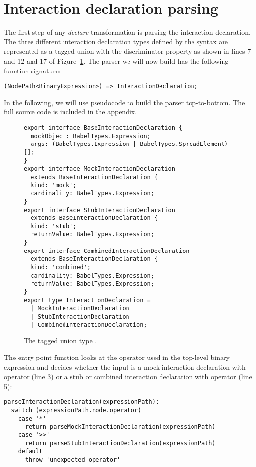 \section{Interaction declaration parsing}
The first step of any \textit{declare} transformation
is parsing the interaction declaration.
The three different interaction declaration types defined by the syntax
are represented as a tagged union 
with the discriminator property 
as shown in lines 7 and 12 and 17
of Figure~\ref{fig:InteractionDeclarationType}.
The parser we will now build has the following function signature:
\begin{verbatim}
(NodePath<BinaryExpression>) => InteractionDeclaration;
\end{verbatim}
In the following, we will use pseudocode to build the parser top-to-bottom.
The full source code is included in the appendix.

\begin{figure}
  \begin{verbatim}
export interface BaseInteractionDeclaration {
  mockObject: BabelTypes.Expression;
  args: (BabelTypes.Expression | BabelTypes.SpreadElement)[];
}
export interface MockInteractionDeclaration
  extends BaseInteractionDeclaration {
  kind: 'mock';
  cardinality: BabelTypes.Expression;
}
export interface StubInteractionDeclaration
  extends BaseInteractionDeclaration {
  kind: 'stub';
  returnValue: BabelTypes.Expression;
}
export interface CombinedInteractionDeclaration
  extends BaseInteractionDeclaration {
  kind: 'combined';
  cardinality: BabelTypes.Expression;
  returnValue: BabelTypes.Expression;
}
export type InteractionDeclaration =
  | MockInteractionDeclaration
  | StubInteractionDeclaration
  | CombinedInteractionDeclaration;
  \end{verbatim}
  \caption{
    The tagged union type .
  }\label{fig:InteractionDeclarationType}
\end{figure}

The entry point function 
looks at the operator used in the top-level binary expression
and decides whether the input is
a mock interaction declaration with operator  (line 3)
or a stub or combined interaction declaration with operator  (line 5):
\begin{verbatim}
parseInteractionDeclaration(expressionPath):
  switch (expressionPath.node.operator)
    case '*'
      return parseMockInteractionDeclaration(expressionPath)
    case '>>'
      return parseStubInteractionDeclaration(expressionPath)
    default
      throw 'unexpected operator'
\end{verbatim}

